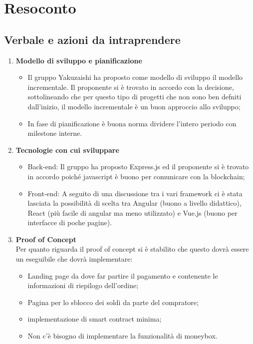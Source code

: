 \section{Resoconto}
\subsection{Verbale e azioni da intraprendere}

\begin{enumerate}
	\item \textbf{Modello di sviluppo e pianificazione}
	\begin{itemize}
		\item Il gruppo Yakuzaishi ha proposto come modello di sviluppo il modello incrementale. Il proponente si è trovato in accordo con la decisione, sottolineando che per questo tipo di progetti che non sono ben defniti dall'inizio, il modello incrementale è un buon approccio allo sviluppo;
		\item In fase di pianificazione è buona norma dividere l'intero periodo con milestone interne.
	\end{itemize}
	\item \textbf{Tecnologie con cui sviluppare}
	\begin{itemize}
		\item Back-end: Il gruppo ha proposto Express.js ed il proponente si è trovato in accordo poiché javascript è buono per comunicare con la blockchain;
		\item Front-end: A seguito di una discussione tra i vari framework ci è stata lasciata la possibilità di scelta tra Angular (buono a livello didattico), React (più facile di angular ma meno utilizzato) e Vue.js (buono per interfacce di poche pagine).
	\end{itemize}
	\item \textbf{Proof of Concept}\\
		Per quanto riguarda il proof of concept si è stabilito che questo dovrà essere un eseguibile che dovrà implementare:
	\begin{itemize}
		\item Landing page da dove far partire il pagamento e contenente le informazioni di riepilogo dell'ordine;
		\item Pagina per lo sblocco dei soldi da parte del compratore;
		\item implementazione di smart contract minima;
		\item Non c'è bisogno di implementare la funzionalità di moneybox.
	\end{itemize}

\end{enumerate}

